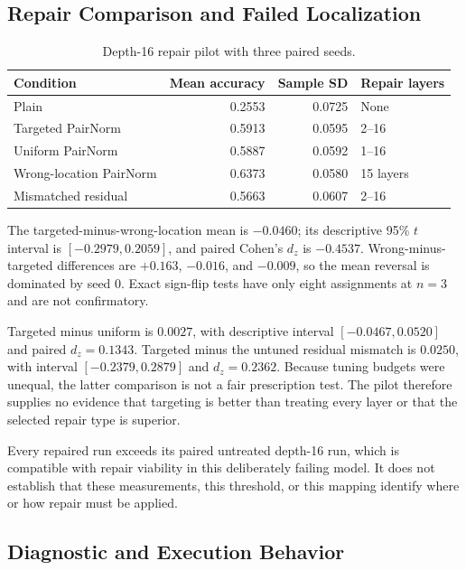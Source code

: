 \documentclass[journal]{IEEEtran}
\begin{document}
\subsection{Repair Comparison and Failed Localization}

\begin{table}[t]
\caption{Depth-16 repair pilot with three paired seeds.}
\label{tab:repair}
\centering
\scriptsize
\setlength{\tabcolsep}{2pt}
\begin{tabular}{p{}rrp{}}
\toprule
Condition & Mean accuracy & Sample SD & Repair layers \\
\midrule
Plain & 0.2553 & 0.0725 & None \\
Targeted PairNorm & 0.5913 & 0.0595 & 2--16 \\
Uniform PairNorm & 0.5887 & 0.0592 & 1--16 \\
Wrong-location PairNorm & 0.6373 & 0.0580 & 15 layers \\
Mismatched residual & 0.5663 & 0.0607 & 2--16 \\
\bottomrule
\end{tabular}
\end{table}

The targeted-minus-wrong-location mean is $-0.0460$; its descriptive 95\% $t$ interval is $[-0.2979,0.2059]$, and paired Cohen's $d_z$ is $-0.4537$. Wrong-minus-targeted differences are $+0.163$, $-0.016$, and $-0.009$, so the mean reversal is dominated by seed 0. Exact sign-flip tests have only eight assignments at $n=3$ and are not confirmatory.

Targeted minus uniform is $0.0027$, with descriptive interval $[-0.0467,0.0520]$ and paired $d_z=0.1343$. Targeted minus the untuned residual mismatch is $0.0250$, with interval $[-0.2379,0.2879]$ and $d_z=0.2362$. Because tuning budgets were unequal, the latter comparison is not a fair prescription test. The pilot therefore supplies no evidence that targeting is better than treating every layer or that the selected repair type is superior.

Every repaired run exceeds its paired untreated depth-16 run, which is compatible with repair viability in this deliberately failing model. It does not establish that these measurements, this threshold, or this mapping identify where or how repair must be applied.

\subsection{Diagnostic and Execution Behavior}
\end{document}
